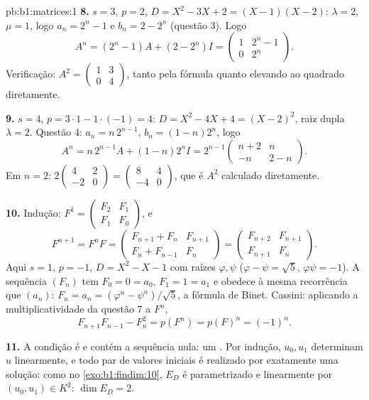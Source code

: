 \begin{solution}{pb:b1:matrices:1}
\textbf{8.} $s = 3$, $p = 2$, $D = X^2 - 3X + 2 = (X - 1)(X -
2)$: $\lambda = 2$, $\mu = 1$, logo $a_n = 2^n - 1$ e
$b_n = 2 -
2^n$ (questão 3). Logo
\[
A^n = (2^n - 1)A + (2 - 2^n)I
= \begin{pmatrix} 1 & 2^n - 1\\ 0 & 2^n \end{pmatrix}.
\]
Verificação: $A^2 = \begin{pmatrix} 1 & 3\\ 0 & 4\end{pmatrix}$, tanto pela fórmula quanto elevando ao quadrado
diretamente.

\textbf{9.} $s = 4$, $p = 3\cdot1 - 1\cdot(-1) = 4$: $D = X^2 -
4X + 4 = (X - 2)^2$, raiz dupla $\lambda = 2$. Questão 4:
$a_n
= n\,2^{n-1}$, $b_n = (1 - n)2^n$, logo
\[
A^n = n\,2^{n-1}A + (1 - n)2^n I
= 2^{n-1}\begin{pmatrix} n + 2 & n\\ -n & 2 - n
\end{pmatrix}.
\]
Em $n = 2$: $2\begin{pmatrix} 4 & 2\\ -2 & 0\end{pmatrix} =
\begin{pmatrix} 8 & 4\\ -4 & 0 \end{pmatrix}$, que é $A^2$ calculado diretamente.

\textbf{10.} Indução: $F^1 = \begin{pmatrix} F_2 & F_1\\ F_1 &
F_0\end{pmatrix}$, e
\[
F^{n+1} = F^n F =
\begin{pmatrix} F_{n+1} + F_n & F_{n+1}\\
F_n + F_{n-1} & F_n \end{pmatrix}
= \begin{pmatrix} F_{n+2} & F_{n+1}\\ F_{n+1} & F_n
\end{pmatrix}.
\]
Aqui $s = 1$, $p = -1$, $D = X^2 - X - 1$ com raízes $\varphi,
\psi$ ($\varphi - \psi = \sqrt5$, $\varphi\psi = -1$). A
sequência $(F_n)$ tem $F_0 = 0 = a_0$, $F_1 = 1 = a_1$ e obedece à mesma recorrência que
$(a_n)$: $F_n = a_n = (\varphi^n -
\psi^n)/\sqrt5$, a fórmula de Binet. Cassini: aplicando a
multiplicatividade da questão 7 a $F^n$,
\[
F_{n+1}F_{n-1} - F_n^2 = p(F^n) = p(F)^n = (-1)^n .
\]

\textbf{11.} A condição é  e contém a sequência nula: um
. Por indução, $u_0, u_1$ determinam $u$ linearmente, e todo par
de valores iniciais é realizado por exatamente uma solução: como no
\cref{exo:b1:findim:10}, $E_D$ é parametrizado  e linearmente por $(u_0, u_1) \in K^2$:
$\dim E_D = 2$.


\end{solution}
